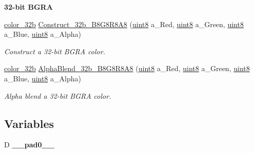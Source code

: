 \begin{Indent}{\bf 32-\/bit BGRA}\par
\begin{DoxyCompactItemize}
\item 
\hyperlink{namespacetil_a8eb2d871b8a6ffb55b3eeb720207a6cb}{color\_\-32b} \hyperlink{namespacetil_afb2e7b72d4fd06e3faf946558fab2c5e}{Construct\_\-32b\_\-B8G8R8A8} (\hyperlink{namespacetil_a7a75b0e7e2cd3f19ea51c8c02fd242f8}{uint8} a\_\-Red, \hyperlink{namespacetil_a7a75b0e7e2cd3f19ea51c8c02fd242f8}{uint8} a\_\-Green, \hyperlink{namespacetil_a7a75b0e7e2cd3f19ea51c8c02fd242f8}{uint8} a\_\-Blue, \hyperlink{namespacetil_a7a75b0e7e2cd3f19ea51c8c02fd242f8}{uint8} a\_\-Alpha)
\begin{DoxyCompactList}\small\item\em Construct a 32-\/bit BGRA color. \item\end{DoxyCompactList}\item 
\hyperlink{namespacetil_a8eb2d871b8a6ffb55b3eeb720207a6cb}{color\_\-32b} \hyperlink{namespacetil_a8e053d490a2c4f46f6a355896bbf7d89}{AlphaBlend\_\-32b\_\-B8G8R8A8} (\hyperlink{namespacetil_a7a75b0e7e2cd3f19ea51c8c02fd242f8}{uint8} a\_\-Red, \hyperlink{namespacetil_a7a75b0e7e2cd3f19ea51c8c02fd242f8}{uint8} a\_\-Green, \hyperlink{namespacetil_a7a75b0e7e2cd3f19ea51c8c02fd242f8}{uint8} a\_\-Blue, \hyperlink{namespacetil_a7a75b0e7e2cd3f19ea51c8c02fd242f8}{uint8} a\_\-Alpha)
\begin{DoxyCompactList}\small\item\em Alpha blend a 32-\/bit BGRA color. \item\end{DoxyCompactList}\end{DoxyCompactItemize}
\end{Indent}
\subsection*{Variables}
\begin{DoxyCompactItemize}
\item 
\hypertarget{namespacetil_affbd5605556e0eeb2d303fbb2d9b6092}{
D {\bfseries \_\-\_\-pad0\_\-\_\-}}
\label{namespacetil_affbd5605556e0eeb2d303fbb2d9b6092}

\end{DoxyCompactItemize}
